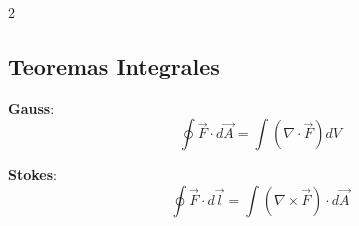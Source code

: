 \begin{multicols}{2}
\begin{itemform}
                \end{itemform}

                \subsection*{Teoremas Integrales}
                \begin{itemform}
                \item \textbf{Gauss}:
                  $$\oint \vec{F}\cdot d\vec{A} = \int (\nabla \cdot \vec{F}) dV$$
                \item \textbf{Stokes}:
                  $$\oint \vec{F}\cdot d\vec{l} = \int (\nabla \times \vec{F}) \cdot d\vec{A}$$
                \end{itemform}

              \end{multicols}

